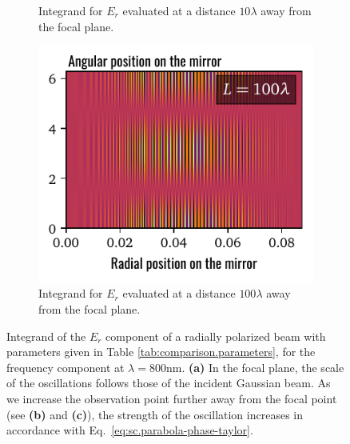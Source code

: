 \documentclass[11pt,SymmetricalJury]{inrsthesis/inrsthesis}
\begin{document}
\begin{figure}
\begin{subfigure}[t]{0.32\textwidth}
    \caption{Integrand for $E_r$ evaluated at a distance $10\lambda$ away from the focal plane.}
    \label{fig:oscillating-phase-with-distance.10L}
  \end{subfigure}
  \hfill
  \begin{subfigure}[t]{0.32\textwidth}
    \centering
    \includegraphics[width=\textwidth]{figs/phase_100L.pdf}
    \caption{Integrand for $E_r$ evaluated at a distance $100\lambda$ away from the focal plane.}
    \label{fig:oscillating-phase-with-distance.100L}
  \end{subfigure}
  \caption[Illustration of oscillation of the integrand with increasing distance from the focal point.]
          {Integrand of the $E_r$ component of a radially polarized beam with parameters given in
            Table \ref{tab:comparison.parameters}, for the frequency component at $\lambda=800\si{\nano\metre}$.
            \textbf{(a)} In the focal plane, the scale of the oscillations follows those of the incident
            Gaussian beam. As we increase the observation point further away from the focal point
            (see \textbf{(b)} and \textbf{(c)}), the strength of the oscillation increases in
            accordance with Eq.~\eqref{eq:sc.parabola-phase-taylor}.
          }
  \label{fig:sc.oscillating-phase-with-distance}
\end{figure}
\end{document}
